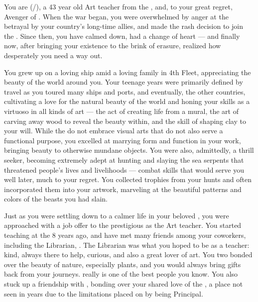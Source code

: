 \documentclass[char]{GL2020}
\begin{document}
\name{\cChupAvenger{}}


You are \cChupAvenger{\full} (\cChupAvenger{\they}/\cChupAvenger{\them}), a 43 year old Art teacher from the \pShip{}, and, to your great regret, Avenger of \cGenesis{}. When the war began, you were overwhelmed by anger at the betrayal by your country's long-time allies, and made the rash decision to join the \pGoaties{}. Since then, you have calmed down, had a change of heart — and finally now, after bringing your existence to the brink of erasure, realized how desperately you need a way out.

You grew up on a loving ship amid a loving family in 4th Fleet, appreciating the beauty of the world around you. Your teenage years were primarily defined by travel as you toured many ships and ports, and eventually, the other countries, cultivating a love for the natural beauty of the world and honing your skills as a virtuoso in all kinds of art — the act of creating life from a mural, the art of carving away wood to reveal the beauty within, and the skill of shaping clay to your will. While the \pShippies{} do not embrace visual arts that do not also serve a functional purpose, you excelled at marrying form and function in your work, bringing beauty to otherwise mundane objects. You were also, admittedly, a thrill seeker, becoming extremely adept at hunting and slaying the sea serpents that threatened people’s lives and livelihoods — combat skills that would serve you well later, much to your regret. You collected trophies from your hunts and often incorporated them into your artwork, marveling at the beautiful patterns and colors of the beasts you had slain.

Just as you were settling down to a calmer life in your beloved \pShip{}, you were approached with a job offer to the prestigious \pSchool{} as the Art teacher. You started teaching at the \pSc{} 8 years ago, and have met many friends among your coworkers, including the Librarian, \cLibrarian{\full}. The Librarian was what you hoped to be as a teacher: kind, always there to help, curious, and also a great lover of art. You two bonded over the beauty of nature, especially plants, and you would always bring gifts back from your journeys. \cLibrarian{} really is one of the best people you know. You also stuck up a friendship with \cPrincipal{\full}, bonding over your shared love of the \pShippies{}, a place \cPrincipal{\they} \cPrincipal{\have} not seen in years due to the limitations placed on \cPrincipal{\them} by being Principal.
\end{document}
